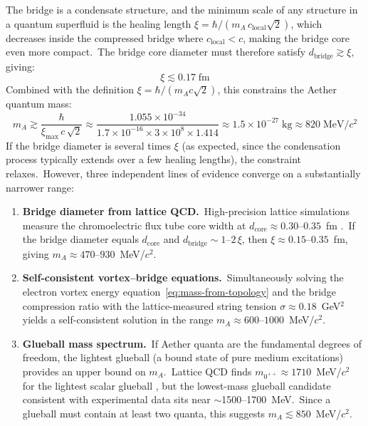 ﻿\documentclass[12pt,letterpaper]{article}
\begin{document}
The bridge is a condensate structure, and the minimum scale of any structure in
a quantum superfluid is the healing length $\xi = \hbar/(m_A\,c_{\mathrm{local}}\sqrt{2})$,
which decreases inside the compressed bridge where $c_{\mathrm{local}} < c$,
making the bridge core even more compact.\ The bridge core diameter must
therefore satisfy $d_{\mathrm{bridge}} \gtrsim \xi$, giving:
%
\begin{equation}
  \xi \lesssim 0.17\;\mathrm{fm}
  \label{eq:xi-upper-bound}
\end{equation}
%
Combined with the definition $\xi = \hbar / (m_A c \sqrt{2})$, this constrains
the Aether quantum mass:
%
\begin{equation}
  m_A \gtrsim \frac{\hbar}{\xi_{\max}\, c\, \sqrt{2}}
    \approx \frac{1.055 \times 10^{-34}}{1.7 \times 10^{-16} \times 3 \times 10^8
    \times 1.414} \approx 1.5 \times 10^{-27}\;\mathrm{kg}
    \approx 820\;\mathrm{MeV}/c^2
  \label{eq:mA-lower-bound}
\end{equation}
%
If the bridge diameter is several times $\xi$ (as expected, since the
condensation process typically extends over a few healing lengths), the
constraint relaxes.\ However, three independent lines of evidence converge on
a substantially narrower range:
%
\begin{enumerate}[leftmargin=2em]
  \item \textbf{Bridge diameter from lattice QCD.}\ High-precision lattice
    simulations measure the chromoelectric flux tube core width at
    $d_{\mathrm{core}} \approx 0.30$--$0.35$~fm \cite{cardoso2013}.\ If the
    bridge diameter equals $d_{\mathrm{core}}$ and
    $d_{\mathrm{bridge}} \sim 1$--$2\,\xi$, then
    $\xi \approx 0.15$--$0.35$~fm, giving
    $m_A \approx 470$--$930$~MeV/$c^2$.

  \item \textbf{Self-consistent vortex--bridge equations.}\ Simultaneously
    solving the electron vortex energy equation~\eqref{eq:mass-from-topology}
    and the bridge compression ratio with the lattice-measured string tension
    $\sigma \approx 0.18$~GeV$^2$ yields a self-consistent solution in the
    range $m_A \approx 600$--$1000$~MeV/$c^2$.

  \item \textbf{Glueball mass spectrum.}\ If Aether quanta are the
    fundamental degrees of freedom, the lightest glueball (a bound state of
    pure medium excitations) provides an upper bound on $m_A$.\ Lattice QCD
    finds $m_{0^{++}} \approx 1710$~MeV/$c^2$ for the lightest scalar
    glueball \cite{morningstar1999}, but the lowest-mass glueball candidate
    consistent with experimental data sits near $\sim$1500--1700~MeV.\ Since
    a glueball must contain at least two quanta, this suggests
    $m_A \lesssim 850$~MeV/$c^2$.
\end{enumerate}
\end{document}
